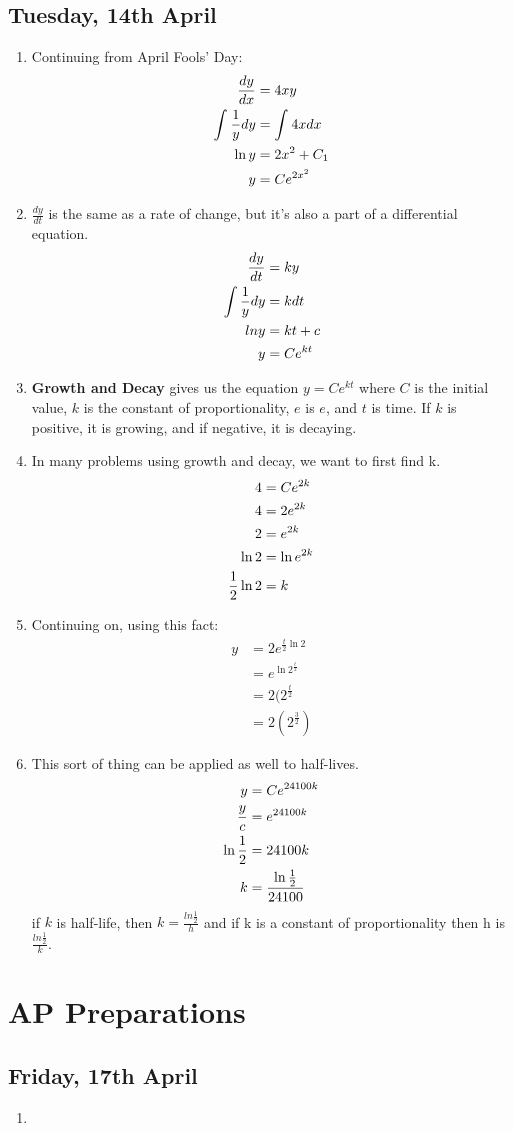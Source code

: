 \documentclass[11pt]{article}
\begin{document}
\subsection{Tuesday, 14th April}
\begin{enumerate}
	\item Continuing from April Fools' Day:
		\begin{align}
			\setcounter{equation}{0}
			\frac{dy}{dx} &= 4xy \\
			\int_{}^{}\frac{1}{y}dy &= \int_{}^{}4xdx \\
			\ln y &= 2x^2+C_1 \\
			y &= Ce^{2x^2}
		\end{align}
	\item $\frac{dy}{dt}$ is the same as a rate of change, but it's also a part
		of a differential equation.
		\begin{align}
			\setcounter{equation}{0}
			\frac{dy}{dt} &= ky \\
			\int \frac{1}{y}dy &= kdt \\
			ln y &= kt+c \\
			y &= Ce^{kt}
		\end{align}
	\item {\bf Growth and Decay} gives us the equation $y = Ce^{kt}$ where 
		$C$ is the initial value, $k$ is the constant of proportionality, $e$ is
		$e$, and $t$ is time.  If $k$ is positive, it is growing, and if negative,
		it is decaying.
	\item In many problems using growth and decay, we want to first find k.
		\begin{align}
			\setcounter{equation}{0}
			4 &= Ce^{2k}\\
			4 &= 2e^{2k}\\
			2 &= e^{2k} \\
			\ln 2 &= \ln e^{2k} \\
			\frac{1}{2} \ln 2 &= k
		\end{align}
	\item Continuing on, using this fact:
		\begin{align}
			y &= 2e^{\frac{t}{2}\ln 2}\\
				&= e^{\ln 2^{\frac{t}{2}}} \\
				&= 2(2^{\frac{t}{2}} \\
				&= 2(2^{\frac{3}{2}})
		\end{align}
	\item This sort of thing can be applied as well to half-lives.
		\begin{align}
			\setcounter{equation}{0}
			y &= Ce^{24100k} \\
			\frac{y}{c} &= e^{24100k} \\
			\ln \frac{1}{2} &= 24100k \\
			k &= \frac{\ln \frac{1}{2}}{24100}
		\end{align}
		if $k$ is half-life, then $k=\frac{ln\frac{1}{2}}{h}$ and if k is a
		constant of proportionality then h is $\frac{ln\frac{1}{2}}{k}$.
\end{enumerate}

\section{AP Preparations}
\subsection{Friday, 17th April}
\begin{enumerate}
	\item 
\end{enumerate}
\end{document}
